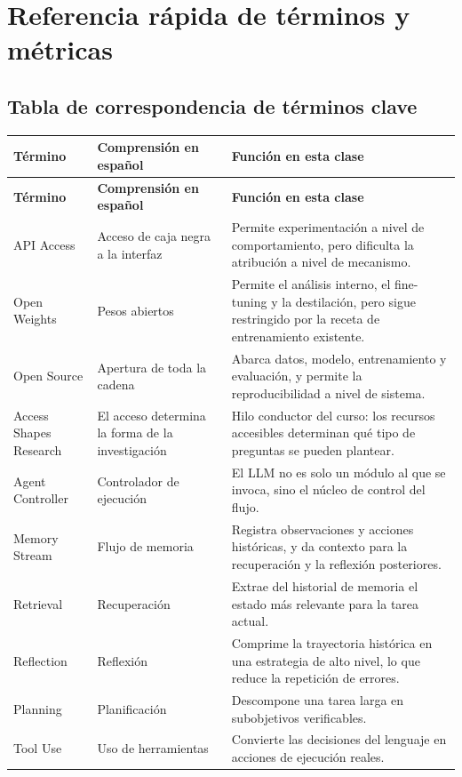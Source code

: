 \documentclass[a4paper]{article}
\begin{document}
\section{Referencia rápida de términos y métricas}

\subsection{Tabla de correspondencia de términos clave}
\begin{longtable}{p{2.7cm}p{3.2cm}p{5.6cm}}
\toprule
\textbf{Término} & \textbf{Comprensión en español} & \textbf{Función en esta clase} \\
\midrule
\endfirsthead
\toprule
\textbf{Término} & \textbf{Comprensión en español} & \textbf{Función en esta clase} \\
\midrule
\endhead
API Access & Acceso de caja negra a la interfaz & Permite experimentación a nivel de comportamiento, pero dificulta la atribución a nivel de mecanismo. \\
Open Weights & Pesos abiertos & Permite el análisis interno, el fine-tuning y la destilación, pero sigue restringido por la receta de entrenamiento existente. \\
Open Source & Apertura de toda la cadena & Abarca datos, modelo, entrenamiento y evaluación, y permite la reproducibilidad a nivel de sistema. \\
Access Shapes Research & El acceso determina la forma de la investigación & Hilo conductor del curso: los recursos accesibles determinan qué tipo de preguntas se pueden plantear. \\
Agent Controller & Controlador de ejecución & El LLM no es solo un módulo al que se invoca, sino el núcleo de control del flujo. \\
Memory Stream & Flujo de memoria & Registra observaciones y acciones históricas, y da contexto para la recuperación y la reflexión posteriores. \\
Retrieval & Recuperación & Extrae del historial de memoria el estado más relevante para la tarea actual. \\
Reflection & Reflexión & Comprime la trayectoria histórica en una estrategia de alto nivel, lo que reduce la repetición de errores. \\
Planning & Planificación & Descompone una tarea larga en subobjetivos verificables. \\
Tool Use & Uso de herramientas & Convierte las decisiones del lenguaje en acciones de ejecución reales. \\

\end{longtable}
\end{document}
